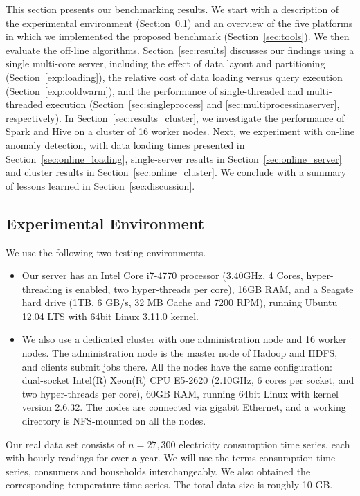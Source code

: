 \documentclass[prodmode,acmtods]{acmsmall}
\begin{document}
This section presents our benchmarking results.  We start with a description of the experimental environment (Section~\ref{sec:exp_env}) and an overview of the five platforms in which we implemented the proposed benchmark (Section~\ref{sec:tools}).  We then evaluate the off-line algorithms.  Section~\ref{sec:results}  discusses our findings using a single multi-core server, including the effect of data layout and partitioning (Section~\ref{exp:loading}), the relative cost of data loading versus query execution (Section~\ref{exp:coldwarm}), and the performance of single-threaded and multi-threaded execution (Section~\ref{sec:singleprocess} and \ref{sec:multiprocessinaserver}, respectively).  In Section~\ref{sec:results_cluster}, we investigate the performance of Spark and Hive on a cluster of 16 worker nodes.  Next, we experiment with on-line anomaly detection, with data loading times presented in Section~\ref{sec:online_loading},  single-server results in Section~\ref{sec:online_server} and cluster results in Section~\ref{sec:online_cluster}.  We conclude with a summary of lessons learned in Section~\ref{sec:discussion}.   


\subsection{Experimental Environment} \label{sec:exp_env}

We use the following two testing environments.

\begin{itemize}
\item
Our server has an Intel Core i7-4770 processor (3.40GHz, 4 Cores,  hyper-threading is enabled, two hyper-threads per core), 16GB RAM, and a Seagate hard drive (1TB,  6 GB/s, 32 MB Cache and 7200 RPM), running Ubuntu 12.04 LTS with 64bit Linux 3.11.0 kernel.   
\item
We also use a dedicated cluster with one administration node and 16 worker nodes.  The administration node is the master node of Hadoop and HDFS, and clients submit jobs there.   All the nodes have the same configuration: dual-socket Intel(R) Xeon(R) CPU E5-2620 (2.10GHz, 6 cores per socket, and two hyper-threads per core), 60GB RAM, running 64bit Linux with kernel version 2.6.32.  The nodes are connected via gigabit Ethernet, and a working directory is NFS-mounted on all the nodes.
\end{itemize}

Our real data set consists of $n=27,300$ electricity consumption time series, each with hourly readings for over a year.  We will use the terms consumption time series, consumers and households interchangeably.  We also obtained the corresponding temperature time series.  The total data size is roughly 10 GB.  
\end{document}
